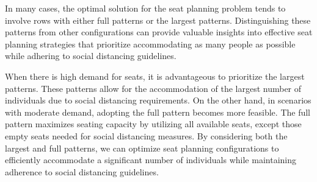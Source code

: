 


In many cases, the optimal solution for the seat planning problem tends to involve rows with either full patterns or the largest patterns. Distinguishing these patterns from other configurations can provide valuable insights into effective seat planning strategies that prioritize accommodating as many people as possible while adhering to social distancing guidelines.

When there is high demand for seats, it is advantageous to prioritize the largest patterns. These patterns allow for the accommodation of the largest number of individuals due to social distancing requirements. On the other hand, in scenarios with moderate demand, adopting the full pattern becomes more feasible. The full pattern maximizes seating capacity by utilizing all available seats, except those empty seats needed for social distancing measures. By considering both the largest and full patterns, we can optimize seat planning configurations to efficiently accommodate a significant number of individuals while maintaining adherence to social distancing guidelines. 



